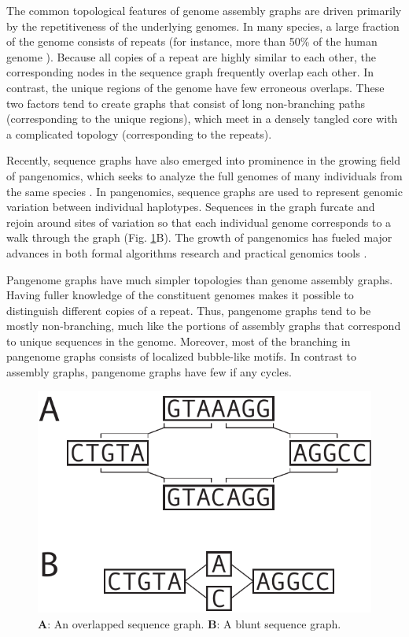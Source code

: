 \documentclass[11pt]{ucthesis}
\newcommand{\figref}[1]{Fig. \ref{fig:#1}}
\begin{document}
The common topological features of genome assembly graphs are driven primarily by the repetitiveness of the underlying genomes.
In many species, a large fraction of the genome consists of repeats (for instance, more than 50\% of the human genome \cite{haubold2006repetitive}).
Because all copies of a repeat are highly similar to each other, the corresponding nodes in the sequence graph frequently overlap each other.
In contrast, the unique regions of the genome have few erroneous overlaps.
These two factors tend to create graphs that consist of long non-branching paths (corresponding to the unique regions), which meet in a densely tangled core with a complicated topology (corresponding to the repeats).

Recently, sequence graphs have also emerged into prominence in the growing field of pangenomics, which seeks to analyze the full genomes of many individuals from the same species \cite{computational2018computational}.
In pangenomics, sequence graphs are used to represent genomic variation between individual haplotypes.
Sequences in the graph furcate and rejoin around sites of variation so that each individual genome corresponds to a walk through the graph (\figref{seqgraphs}B).
The growth of pangenomics has fueled major advances in both formal algorithms research \cite{rautiainen2017aligning,jain2020complexity} and practical genomics tools \cite{garrison2018variation,rautiainen2020graphaligner}.

Pangenome graphs have much simpler topologies than genome assembly graphs.
Having fuller knowledge of the constituent genomes makes it possible to distinguish different copies of a repeat.
Thus, pangenome graphs tend to be mostly non-branching, much like the portions of assembly graphs that correspond to unique sequences in the genome.
Moreover, most of the branching in pangenome graphs consists of localized bubble-like motifs.
In contrast to assembly graphs, pangenome graphs have few if any cycles.

\begin{figure}
\begin{center}
\includegraphics[width=.5\textwidth]{bluntfigures/overlap_vs_blunt.pdf}
\caption{\textbf{A}: An overlapped sequence graph. \textbf{B}: A blunt sequence graph.} \label{fig:seqgraphs}
\end{center}
\end{figure}
\end{document}
